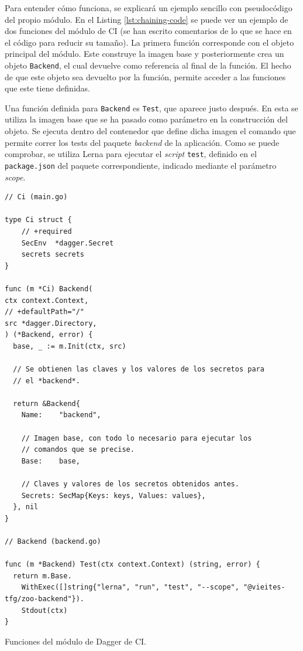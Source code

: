 Para entender cómo funciona, se explicará un ejemplo sencillo con pseudocódigo del propio módulo. En el Listing \ref{lst:chaining-code} se puede ver un ejemplo de dos funciones del módulo de CI (se han escrito comentarios de lo que se hace en el código para reducir su tamaño). La primera función corresponde con el objeto principal del módulo. Este construye la imagen base y posteriormente crea un objeto \texttt{Backend}, el cual devuelve como referencia al final de la función. El hecho de que este objeto sea devuelto por la función, permite acceder a las funciones que este tiene definidas.

Una función definida para \texttt{Backend} es \texttt{Test}, que aparece justo después. En esta se utiliza la imagen base que se ha pasado como parámetro en la construcción del objeto. Se ejecuta dentro del contenedor que define dicha imagen el comando que permite correr los tests del paquete \textit{backend} de la aplicación. Como se puede comprobar, se utiliza Lerna para ejecutar el \textit{script} \texttt{test}, definido en el \texttt{package.json} del paquete correspondiente, indicado mediante el parámetro \textit{scope}.

\begin{longlisting}
  \begin{verbatim}
// Ci (main.go)

type Ci struct {
	// +required
	SecEnv  *dagger.Secret
	secrets secrets
}

func (m *Ci) Backend(
ctx context.Context,
// +defaultPath="/"
src *dagger.Directory,
) (*Backend, error) {
  base, _ := m.Init(ctx, src)

  // Se obtienen las claves y los valores de los secretos para
  // el *backend*.

  return &Backend{
    Name:    "backend",

    // Imagen base, con todo lo necesario para ejecutar los
    // comandos que se precise.
    Base:    base,

    // Claves y valores de los secretos obtenidos antes.
    Secrets: SecMap{Keys: keys, Values: values},
  }, nil
}

// Backend (backend.go)

func (m *Backend) Test(ctx context.Context) (string, error) {
  return m.Base.
    WithExec([]string{"lerna", "run", "test", "--scope", "@vieites-tfg/zoo-backend"}).
    Stdout(ctx)
}

\end{verbatim}
\caption{Funciones del módulo de Dagger de CI.}
\label{lst:chaining-code}
\end{longlisting}

